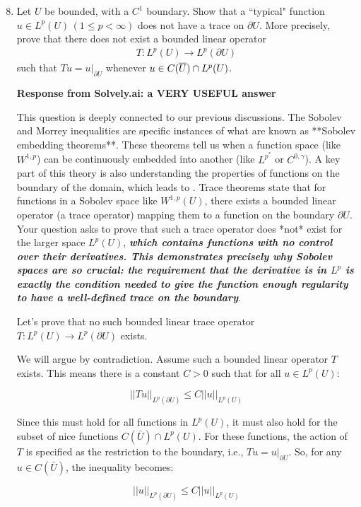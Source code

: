 \documentclass[12pt,a4paper]{report}
\begin{document}
\begin{enumerate}
	\setcounter{enumi}{7}
	\item Let $U$ be bounded, with a $C^1$ boundary.  Show that a ``typical" function $u \in L^p(U)\, (1 \le p <\infty)$ does not have a trace on $\partial U$.  More precisely, prove that there does not exist a bounded linear operator
	\begin{align*}
		T:L^p(U) \to L^p(\partial U)
	\end{align*}such that $Tu = u|_{\partial U}$ whenever $u \in C(\overline{U})\cap L^p(U)$.
	
	\textbf{Response from Solvely.ai: a VERY USEFUL answer}
	
	This question is deeply connected to our previous discussions. The Sobolev and Morrey inequalities are specific instances of what are known as **Sobolev embedding theorems**. These theorems tell us when a function space (like $W^{1,p}$) can be continuously embedded into another (like $L^{p^*}$ or $C^{0,\gamma}$). A key part of this theory is also understanding the properties of functions on the boundary of the domain, which leads to . Trace theorems state that for functions in a Sobolev space like $W^{1,p}(U)$, there exists a bounded linear operator (a trace operator) mapping them to a function on the boundary $\partial U$. Your question asks to prove that such a trace operator does *not* exist for the larger space $L^p(U)$, \textbf{\textit{which contains functions with no control over their derivatives. This demonstrates precisely why Sobolev spaces are so crucial: the requirement that the derivative is in $L^p$ is exactly the condition needed to give the function enough regularity to have a well-defined trace on the boundary}}.

Let's prove that no such bounded linear trace operator $T:L^p(U) \to L^p(\partial U)$ exists.

We will argue by contradiction. Assume such a bounded linear operator $T$ exists. This means there is a constant $C>0$ such that for all $u \in L^p(U)$:

$$||Tu||_{L^p(\partial U)} \le C ||u||_{L^p(U)}$$

Since this must hold for all functions in $L^p(U)$, it must also hold for the subset of nice functions $C(\bar{U}) \cap L^p(U)$. For these functions, the action of $T$ is specified as the restriction to the boundary, i.e., $Tu = u|_{\partial U}$. So, for any $u \in C(\bar{U})$, the inequality becomes:

$$||u||_{L^p(\partial U)} \le C ||u||_{L^p(U)}$$


\end{enumerate}
\end{document}
